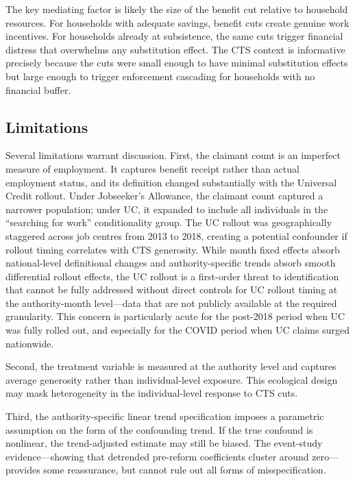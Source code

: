 \documentclass[12pt]{article}
\begin{document}
The key mediating factor is likely the size of the benefit cut relative to household resources. For households with adequate savings, benefit cuts create genuine work incentives. For households already at subsistence, the same cuts trigger financial distress that overwhelms any substitution effect. The CTS context is informative precisely because the cuts were small enough to have minimal substitution effects but large enough to trigger enforcement cascading for households with no financial buffer.

\subsection{Limitations}

Several limitations warrant discussion. First, the claimant count is an imperfect measure of employment. It captures benefit receipt rather than actual employment status, and its definition changed substantially with the Universal Credit rollout. Under Jobseeker's Allowance, the claimant count captured a narrower population; under UC, it expanded to include all individuals in the ``searching for work'' conditionality group. The UC rollout was geographically staggered across job centres from 2013 to 2018, creating a potential confounder if rollout timing correlates with CTS generosity. While month fixed effects absorb national-level definitional changes and authority-specific trends absorb smooth differential rollout effects, the UC rollout is a first-order threat to identification that cannot be fully addressed without direct controls for UC rollout timing at the authority-month level---data that are not publicly available at the required granularity. This concern is particularly acute for the post-2018 period when UC was fully rolled out, and especially for the COVID period when UC claims surged nationwide.

Second, the treatment variable is measured at the authority level and captures average generosity rather than individual-level exposure. This ecological design may mask heterogeneity in the individual-level response to CTS cuts.

Third, the authority-specific linear trend specification imposes a parametric assumption on the form of the confounding trend. If the true confound is nonlinear, the trend-adjusted estimate may still be biased. The event-study evidence---showing that detrended pre-reform coefficients cluster around zero---provides some reassurance, but cannot rule out all forms of misspecification.
\end{document}
